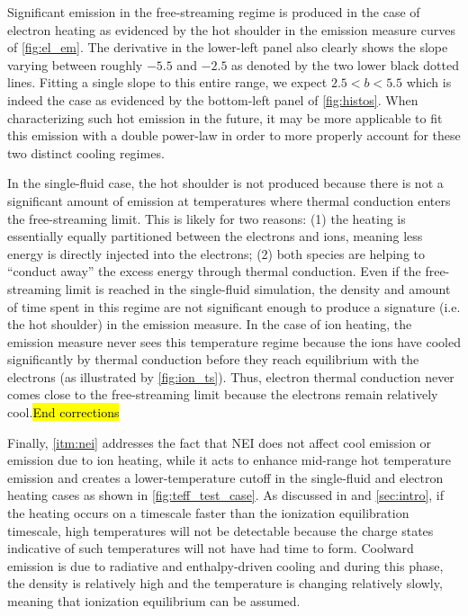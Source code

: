 \documentclass[apj]{emulateapj}
\begin{document}
	\par Significant emission in the free-streaming regime is produced in the case of electron heating as evidenced by the hot shoulder in the emission measure curves of \autoref{fig:el_em}. The derivative in the lower-left panel also clearly shows the slope varying between roughly $-5.5$ and $-2.5$ as denoted by the two lower black dotted lines. Fitting a single slope to this entire range, we expect $2.5<b<5.5$ which is indeed the case as evidenced by the bottom-left panel of \autoref{fig:histos}. When characterizing such hot emission in the future, it may be more applicable to fit this emission with a double power-law in order to more properly account for these two distinct cooling regimes.
	\par In the single-fluid case, the hot shoulder is not produced because there is not a significant amount of emission at temperatures where thermal conduction enters the free-streaming limit. This is likely for two reasons: (1) the heating is essentially equally partitioned between the electrons and ions, meaning less energy is directly injected into the electrons; (2) both species are helping to ``conduct away'' the excess energy through thermal conduction. Even if the free-streaming limit is reached in the single-fluid simulation, the density and amount of time spent in this regime are not significant enough to produce a signature (i.e. the hot shoulder) in the emission measure. In the case of ion heating, the emission measure never sees this temperature regime because the ions have cooled significantly by thermal conduction before they reach equilibrium with the electrons (as illustrated by \autoref{fig:ion_ts}). Thus, electron thermal conduction never comes close to the free-streaming limit because the electrons remain relatively cool.\hl{End corrections}
	\par Finally, \autoref{itm:nei} addresses the fact that NEI does not affect cool emission or emission due to ion heating, while it acts to enhance mid-range hot temperature emission and creates a lower-temperature cutoff in the single-fluid and electron heating cases as shown in \autoref{fig:teff_test_case}. As discussed in  and \autoref{sec:intro}, if the heating occurs on a timescale faster than the ionization equilibration timescale, high temperatures will not be detectable because the charge states indicative of such temperatures will not have had time to form. Coolward emission is due to radiative and enthalpy-driven cooling and during this phase, the density is relatively high and the temperature is changing relatively slowly, meaning that ionization equilibrium can be assumed. 
\end{document}
